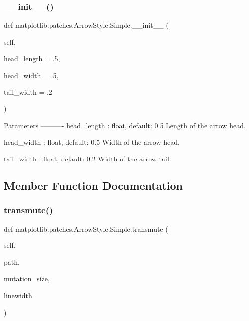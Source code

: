 \subsubsection{\texorpdfstring{\+\_\+\+\_\+init\+\_\+\+\_\+()}{\_\_init\_\_()}}
{\footnotesize\ttfamily def matplotlib.\+patches.\+Arrow\+Style.\+Simple.\+\_\+\+\_\+init\+\_\+\+\_\+ (\begin{DoxyParamCaption}\item[{}]{self,  }\item[{}]{head\+\_\+length = {\ttfamily .5},  }\item[{}]{head\+\_\+width = {\ttfamily .5},  }\item[{}]{tail\+\_\+width = {\ttfamily .2} }\end{DoxyParamCaption})}

\begin{DoxyVerb}Parameters
----------
head_length : float, default: 0.5
    Length of the arrow head.

head_width : float, default: 0.5
    Width of the arrow head.

tail_width : float, default: 0.2
    Width of the arrow tail.
\end{DoxyVerb}
 

\subsection{Member Function Documentation}
\mbox{\label{classmatplotlib_1_1patches_1_1ArrowStyle_1_1Simple_a039d61b26059a33ad7a5b25d68a0cfee}} 
\subsubsection{\texorpdfstring{transmute()}{transmute()}}
{\footnotesize\ttfamily def matplotlib.\+patches.\+Arrow\+Style.\+Simple.\+transmute (\begin{DoxyParamCaption}\item[{}]{self,  }\item[{}]{path,  }\item[{}]{mutation\+\_\+size,  }\item[{}]{linewidth }\end{DoxyParamCaption})}



